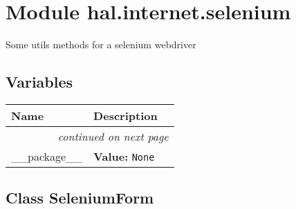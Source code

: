 %
%
%


\section{Module hal.internet.selenium}

    \label{hal:internet:selenium}
Some utils methods for a selenium webdriver



  \subsection{Variables}

    \vspace{-1cm}
\hspace{\varindent}\begin{longtable}{|p{\varnamewidth}|p{\vardescrwidth}|l}
\cline{1-2}
\cline{1-2} \centering \textbf{Name} & \centering \textbf{Description}& \\
\cline{1-2}
\endhead\cline{1-2}\multicolumn{3}{r}{\small\textit{continued on next page}}\\\endfoot\cline{1-2}
\endlastfoot\raggedright \_\-\_\-p\-a\-c\-k\-a\-g\-e\-\_\-\_\- & \raggedright \textbf{Value:} 
{\tt None}&\\
\cline{1-2}
\end{longtable}



\subsection{Class SeleniumForm}

